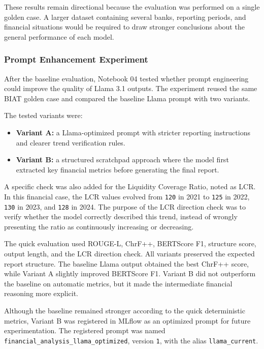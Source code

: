 These results remain directional because the evaluation was performed on a single golden case. A larger dataset containing several banks, reporting periods, and financial situations would be required to draw stronger conclusions about the general performance of each model.


    \subsubsection{Prompt Enhancement Experiment}


After the baseline evaluation, Notebook 04 tested whether prompt engineering could improve the quality of Llama 3.1 outputs. The experiment reused the same BIAT golden case and compared the baseline Llama prompt with two variants.

The tested variants were:

\begin{itemize}
    \item \textbf{Variant A:} a Llama-optimized prompt with stricter reporting instructions and clearer trend verification rules.
    \item \textbf{Variant B:} a structured scratchpad approach where the model first extracted key financial metrics before generating the final report.
\end{itemize}

A specific check was also added for the Liquidity Coverage Ratio, noted as LCR. In this financial case, the LCR values evolved from \texttt{120} in 2021 to \texttt{125} in 2022, \texttt{130} in 2023, and \texttt{128} in 2024. The purpose of the LCR direction check was to verify whether the model correctly described this trend, instead of wrongly presenting the ratio as continuously increasing or decreasing.

The quick evaluation used ROUGE-L, ChrF++, BERTScore F1, structure score, output length, and the LCR direction check. All variants preserved the expected report structure. The baseline Llama output obtained the best ChrF++ score, while Variant A slightly improved BERTScore F1. Variant B did not outperform the baseline on automatic metrics, but it made the intermediate financial reasoning more explicit.

Although the baseline remained stronger according to the quick deterministic metrics, Variant B was registered in MLflow as an optimized prompt for future experimentation. The registered prompt was named \texttt{financial\_analysis\_llama\_optimized}, version \texttt{1}, with the alias \texttt{llama\_current}.

